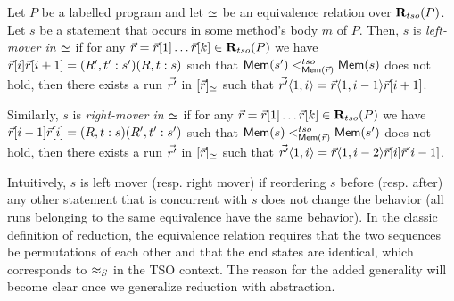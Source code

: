 \documentclass[preprint,9pt]{sigplanconf}
\begin{document}
\begin{definition}[Movers]
\label{def:movers}
Let $P$ be a labelled program and let $\simeq$ be an equivalence relation over $\mathbf{R}_{tso}(P)$.
Let $s$ be a statement that occurs in some method's body $m$ of $P$.
Then, $s$ is {\em left-mover in $\simeq$} if for any $\vec{r}=\vec{r}[1]\ldots\vec{r}[k]\in\mathbf{R}_{tso}(P)$ we have $\vec{r}[i]\vec{r}[i+1]=(R',t':s')(R,t:s)$ such that $\mathsf{Mem}(s') <^{tso}_{\mathsf{Mem}(\vec{r})} \mathsf{Mem}(s)$ does not hold, then there exists a run $\vec{r'}$ in $[\vec{r}]_{\simeq}$ such that $\vec{r'}\langle 1,i\rangle=\vec{r}\langle 1,i-1\rangle \vec{r}[i+1]$.

Similarly, $s$ is {\em right-mover in $\simeq$} if for any $\vec{r}=\vec{r}[1]\ldots\vec{r}[k]\in\mathbf{R}_{tso}(P)$ we have $\vec{r}[i-1]\vec{r}[i]=(R,t:s)(R',t':s')$ such that $\mathsf{Mem}(s) <^{tso}_{\mathsf{Mem}(\vec{r})} \mathsf{Mem}(s')$ does not hold, then there exists a run $\vec{r'}$ in $[\vec{r}]_{\simeq}$ such that $\vec{r'}\langle 1,i\rangle=\vec{r}\langle 1,i-2\rangle \vec{r}[i]\vec{r}[i-1]$.
\end{definition}

Intuitively, $s$ is left mover (resp. right mover) if reordering $s$ before (resp. after) any other statement that is concurrent with $s$ does not change the behavior (all runs belonging to the same equivalence have the same behavior).
In the classic definition of reduction, the equivalence relation requires that the two sequences be permutations of each other and that the end states are identical, which corresponds to $\approx_S$ in the TSO context.
The reason for the added generality will become clear once we generalize reduction with abstraction.
\end{document}
